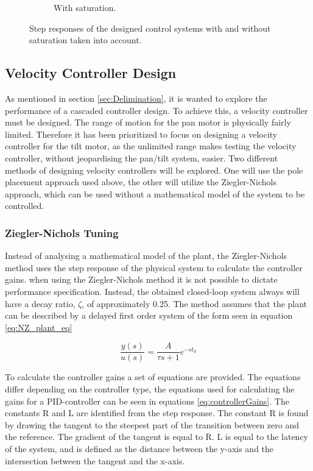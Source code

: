 \documentclass[../../main.tex]{subfiles}
\begin{document}
\begin{figure}[h]
\begin{subfigure}{0.48\textwidth}
    \caption{With saturation.}
    \label{fig:PosStepNoSat}
\end{subfigure}
\caption{Step responses of the designed control systems with and without saturation taken into account.}
\label{fig:PosStep}
\end{figure}


\subsection{Velocity Controller Design}
As mentioned in section \ref{sec:Delimination}, it is wanted to explore the performance of a cascaded controller design. To achieve this, a velocity controller must be designed. The range of motion for the pan motor is physically fairly limited. Therefore it has been prioritized to focus on designing a velocity controller for the tilt motor, as the unlimited range makes testing the velocity controller, without jeopardising the pan/tilt system, easier. Two different methods of designing velocity controllers will be explored. One will use the pole placement approach used above, the other will utilize the Ziegler-Nichols approach, which can be used without a mathematical model of the system to be controlled.

\subsubsection{Ziegler-Nichols Tuning}
Instead of analysing a mathematical model of the plant, the Ziegler-Nichols method uses the step response of the physical system to calculate the controller gains. when using the Ziegler-Nichols method it is not possible to dictate performance specification. Instead, the obtained closed-loop system always will have a decay ratio, $\zeta$, of approximately 0.25. The method assumes that the plant can be described by a delayed first order system of the form seen in equation \ref{eq:NZ_plant_eq}

\begin{equation}
    \frac{y(s)}{u(s)} = \frac{A}{\tau s + 1} e^{-s t_d}
    \label{eq:NZ_plant_eq}
\end{equation}

To calculate the controller gains a set of equations are provided. The equations differ depending on the controller type, the equations used for calculating the gains for a PID-controller can be seen in equations \ref{eq:controllerGains}. The constants R and L are identified from the step response. The constant R is found by drawing the tangent to the steepest part of the transition between zero and the reference. The gradient of the tangent is equal to R. L is equal to the latency of the system, and is defined as the distance between the y-axis and the intersection between the tangent and the x-axis. 
\end{document}
